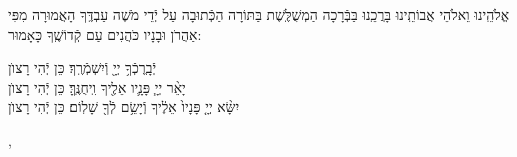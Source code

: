 \documentclass[twoside, openany, parskip=half, 11pt]{book}
\begin{document}

\weekdaysakedusha

\vspace{\baselineskip}
\sepline


\weekdaysabinah

\weekdaysateshuva

\weekdaysaselichah

\weekdaysageulah

\weekdaysaanneinu

\weekdaysarefuah

\weekdaysaberacha

\enlargethispage{\baselineskip}

\weekdaysashofar

\weekdaysamishpat

\weekdaysaminim

\weekdaysatzadikim

\weekdaysayerushelayim

\weekdaysamalchus

\weekdaysashemakoleinu

\retzeh

\yaalehveyavo

\enlargethispage{\baselineskip}

\zion

\modim

\alhanisim

\weekdaysahodos


אֱלֹהֵֽינוּ וֵאלֹהֵי אֲבוֹתֵֽינוּ בָּרֲכֵֽנוּ בַּבְּֿרָכָה הַמְשֻׁלֶּֽשֶׁת בַּתּוֹרָה
הַכְּֿתוּבָה עַל יְֿדֵי מֹשֶׁה עַבְדֶּֽךָ הָאֲמוּרָה מִפִּי אַהֲרֹן וּבָנָיו כֹּהֲנִים עַם קְֿדוֹשֶֽׁךָ כָּאָמוּר:

יְֿבָֽרֶכְֿךָ֥ יְיָ֖ וְֿיִשְׁמְֿרֶֽךָ׃ \hfill \kahal כֵּן יְֿהִי רָצוׂן \\
יָאֵ֨ר יְיָ֧ פָּנָ֛יו אֵלֶ֖יךָ וִֽיחֻנֶּֽךָּ׃ \hfill \kahal כֵּן יְֿהִי רָצוׂן \\
יִשָּׂ֨א יְיָ֤ פָּנָיו֙ אֵלֶ֔יךָ וְֿיָשֵׂ֥ם לְֿךָ֖ שָׁלֽוֹם׃ \hfill \kahal כֵּן יְֿהִי רָצוׂן

\simshalom{\ayt}

\tachanunim

\enlargethispage{\baselineskip}

,
\\
\\
\\
\\
\end{document}
